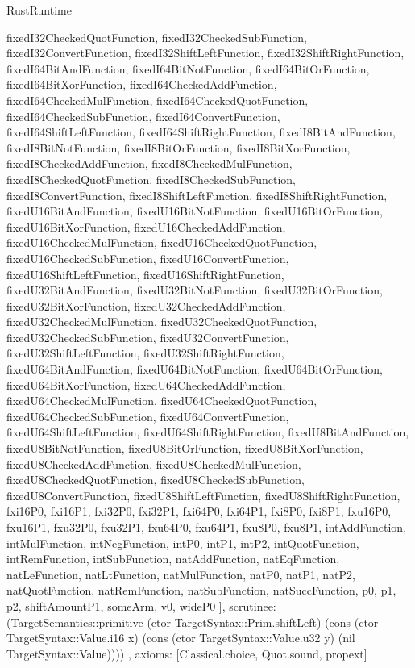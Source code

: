 \begin{lexlean}{RustRuntime}
\begin{semanticmodule}
{{      fixedI32CheckedQuotFunction,
      fixedI32CheckedSubFunction,
      fixedI32ConvertFunction,
      fixedI32ShiftLeftFunction,
      fixedI32ShiftRightFunction,
      fixedI64BitAndFunction,
      fixedI64BitNotFunction,
      fixedI64BitOrFunction,
      fixedI64BitXorFunction,
      fixedI64CheckedAddFunction,
      fixedI64CheckedMulFunction,
      fixedI64CheckedQuotFunction,
      fixedI64CheckedSubFunction,
      fixedI64ConvertFunction,
      fixedI64ShiftLeftFunction,
      fixedI64ShiftRightFunction,
      fixedI8BitAndFunction,
      fixedI8BitNotFunction,
      fixedI8BitOrFunction,
      fixedI8BitXorFunction,
      fixedI8CheckedAddFunction,
      fixedI8CheckedMulFunction,
      fixedI8CheckedQuotFunction,
      fixedI8CheckedSubFunction,
      fixedI8ConvertFunction,
      fixedI8ShiftLeftFunction,
      fixedI8ShiftRightFunction,
      fixedU16BitAndFunction,
      fixedU16BitNotFunction,
      fixedU16BitOrFunction,
      fixedU16BitXorFunction,
      fixedU16CheckedAddFunction,
      fixedU16CheckedMulFunction,
      fixedU16CheckedQuotFunction,
      fixedU16CheckedSubFunction,
      fixedU16ConvertFunction,
      fixedU16ShiftLeftFunction,
      fixedU16ShiftRightFunction,
      fixedU32BitAndFunction,
      fixedU32BitNotFunction,
      fixedU32BitOrFunction,
      fixedU32BitXorFunction,
      fixedU32CheckedAddFunction,
      fixedU32CheckedMulFunction,
      fixedU32CheckedQuotFunction,
      fixedU32CheckedSubFunction,
      fixedU32ConvertFunction,
      fixedU32ShiftLeftFunction,
      fixedU32ShiftRightFunction,
      fixedU64BitAndFunction,
      fixedU64BitNotFunction,
      fixedU64BitOrFunction,
      fixedU64BitXorFunction,
      fixedU64CheckedAddFunction,
      fixedU64CheckedMulFunction,
      fixedU64CheckedQuotFunction,
      fixedU64CheckedSubFunction,
      fixedU64ConvertFunction,
      fixedU64ShiftLeftFunction,
      fixedU64ShiftRightFunction,
      fixedU8BitAndFunction,
      fixedU8BitNotFunction,
      fixedU8BitOrFunction,
      fixedU8BitXorFunction,
      fixedU8CheckedAddFunction,
      fixedU8CheckedMulFunction,
      fixedU8CheckedQuotFunction,
      fixedU8CheckedSubFunction,
      fixedU8ConvertFunction,
      fixedU8ShiftLeftFunction,
      fixedU8ShiftRightFunction,
      fxi16P0,
      fxi16P1,
      fxi32P0,
      fxi32P1,
      fxi64P0,
      fxi64P1,
      fxi8P0,
      fxi8P1,
      fxu16P0,
      fxu16P1,
      fxu32P0,
      fxu32P1,
      fxu64P0,
      fxu64P1,
      fxu8P0,
      fxu8P1,
      intAddFunction,
      intMulFunction,
      intNegFunction,
      intP0,
      intP1,
      intP2,
      intQuotFunction,
      intRemFunction,
      intSubFunction,
      natAddFunction,
      natEqFunction,
      natLeFunction,
      natLtFunction,
      natMulFunction,
      natP0,
      natP1,
      natP2,
      natQuotFunction,
      natRemFunction,
      natSubFunction,
      natSuccFunction,
      p0,
      p1,
      p2,
      shiftAmountP1,
      someArm,
      v0,
      wideP0
    ],
    scrutinee: (TargetSemantics::primitive (ctor TargetSyntax::Prim.shiftLeft) (cons (ctor TargetSyntax::Value.i16 x) (cons (ctor TargetSyntax::Value.u32 y) (nil TargetSyntax::Value))))
  },
  axioms: [Classical.choice, Quot.sound, propext]
}


\end{semanticmodule}
\end{lexlean}
